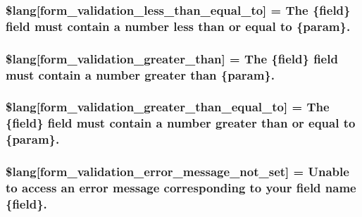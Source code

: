 \subsubsection[{\$lang}]{\setlength{\rightskip}{0pt plus 5cm}\$lang\mbox{[}\textquotesingle{}form\+\_\+validation\+\_\+less\+\_\+than\+\_\+equal\+\_\+to\textquotesingle{}\mbox{]} = \textquotesingle{}The \{field\} field must contain {\bf a} number less than or equal to \{param\}.\textquotesingle{}}\label{form__validation__lang_8php_a687b3be07540d640e2b308086c855c83}
\hypertarget{form__validation__lang_8php_aa01f66851d0140114c2216e6ab5daf06}{}
\subsubsection[{\$lang}]{\setlength{\rightskip}{0pt plus 5cm}\$lang\mbox{[}\textquotesingle{}form\+\_\+validation\+\_\+greater\+\_\+than\textquotesingle{}\mbox{]} = \textquotesingle{}The \{field\} field must contain {\bf a} number greater than \{param\}.\textquotesingle{}}\label{form__validation__lang_8php_aa01f66851d0140114c2216e6ab5daf06}
\hypertarget{form__validation__lang_8php_a255dc63d9dceb22751acebc1ffc43be8}{}
\subsubsection[{\$lang}]{\setlength{\rightskip}{0pt plus 5cm}\$lang\mbox{[}\textquotesingle{}form\+\_\+validation\+\_\+greater\+\_\+than\+\_\+equal\+\_\+to\textquotesingle{}\mbox{]} = \textquotesingle{}The \{field\} field must contain {\bf a} number greater than or equal to \{param\}.\textquotesingle{}}\label{form__validation__lang_8php_a255dc63d9dceb22751acebc1ffc43be8}
\hypertarget{form__validation__lang_8php_ad29f9046f70e4b900cf5283143de0618}{}
\subsubsection[{\$lang}]{\setlength{\rightskip}{0pt plus 5cm}\$lang\mbox{[}\textquotesingle{}form\+\_\+validation\+\_\+error\+\_\+message\+\_\+not\+\_\+set\textquotesingle{}\mbox{]} = \textquotesingle{}Unable to access an error message corresponding to your field name \{field\}.\textquotesingle{}}\label{form__validation__lang_8php_ad29f9046f70e4b900cf5283143de0618}
\hypertarget{form__validation__lang_8php_ae48fb4c900d50c05f0939f9fec1262a2}{}
